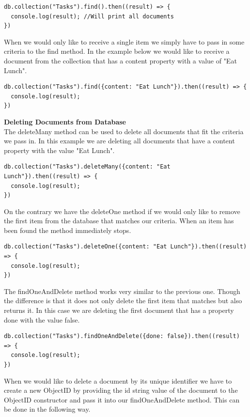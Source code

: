 \documentclass[11pt]{article}
\begin{document}
\begin{lstlisting}
db.collection("Tasks").find().then((result) => {
  console.log(result); //Will print all documents
})
\end{lstlisting}

When we would only like to receive a single item we simply have to pass in some criteria to the find method. In the example below we would like to receive a document from the collection that has a content property with a value of "Eat Lunch". 

\begin{lstlisting}
db.collection("Tasks").find({content: "Eat Lunch"}).then((result) => {
  console.log(result);
})
\end{lstlisting}

\noindent
\textbf{Deleting Documents from Database} \\  
The deleteMany method can be used to delete all documents that fit the criteria we pass in. In this example we are deleting all documents that have a content property with the value "Eat Lunch". 

\begin{lstlisting}
db.collection("Tasks").deleteMany({content: "Eat Lunch"}).then((result) => {
  console.log(result);
})
\end{lstlisting}

On the contrary we have the deleteOne method if we would only like to remove the first item from the database that matches our criteria. When an item has been found the method immediately stops. 
\begin{lstlisting}
db.collection("Tasks").deleteOne({content: "Eat Lunch"}).then((result) => {
  console.log(result);
})
\end{lstlisting}


The findOneAndDelete method works very similar to the previous one. Though the difference is that it does not only delete the first item that matches but also returns it. In this case we are deleting the first document that has a property done with the value false. 

\begin{lstlisting}
db.collection("Tasks").findOneAndDelete({done: false}).then((result) => {
  console.log(result);
})
\end{lstlisting}

When we would like to delete a document by its unique identifier we have to create a new ObjectID by providing the id string value of the document to the ObjectID constructor and pass it into our findOneAndDelete method. This can be done in the following way. 
\end{document}
